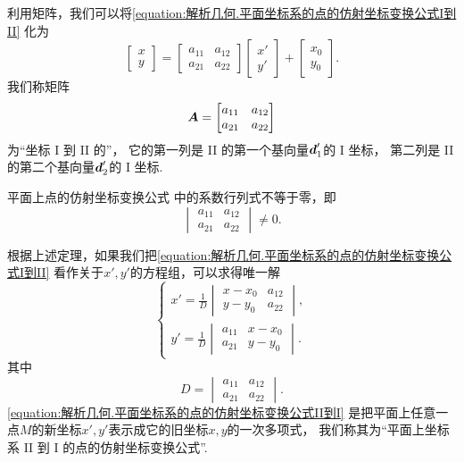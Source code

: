 利用矩阵，我们可以将\cref{equation:解析几何.平面坐标系的点的仿射坐标变换公式I到II}
化为\begin{equation}\label{equation:解析几何.平面坐标系的点的仿射坐标变换公式I到II.矩阵形式1}
	\begin{bmatrix}
		x \\ y
	\end{bmatrix}
	= \begin{bmatrix}
		a_{11} & a_{12} \\
		a_{21} & a_{22}
	\end{bmatrix} \begin{bmatrix}
		x' \\ y'
	\end{bmatrix} + \begin{bmatrix}
		x_0 \\ y_0
	\end{bmatrix}.
\end{equation}
我们称矩阵\[
	\boldsymbol{A} = \begin{bmatrix}
		a_{11} & a_{12} \\
		a_{21} & a_{22}
	\end{bmatrix}
\]为“坐标 I 到 II 的”，
它的第一列是 II 的第一个基向量\(\boldsymbol{d}_1'\)的 I 坐标，
第二列是 II 的第二个基向量\(\boldsymbol{d}_2'\)的 I 坐标.

\begin{theorem}
平面上点的仿射坐标变换公式 
中的系数行列式不等于零，即\[
	\begin{vmatrix}
		a_{11} & a_{12} \\
		a_{21} & a_{22}
	\end{vmatrix} \neq 0.
\]
\end{theorem}

根据上述定理，如果我们把\cref{equation:解析几何.平面坐标系的点的仿射坐标变换公式I到II}
看作关于\(x',y'\)的方程组，可以求得唯一解
\begin{equation}\label{equation:解析几何.平面坐标系的点的仿射坐标变换公式II到I}
	\left\{ \begin{array}{l}
		x' = \frac{1}{D} \begin{vmatrix}
			x - x_0 & a_{12} \\
			y - y_0 & a_{22}
		\end{vmatrix}, \\
		y' = \frac{1}{D} \begin{vmatrix}
			a_{11} & x - x_0 \\
			a_{21} & y - y_0
		\end{vmatrix}.
	\end{array} \right.
\end{equation}
其中\[
	D = \begin{vmatrix}
		a_{11} & a_{12} \\
		a_{21} & a_{22}
	\end{vmatrix}.
\]
\cref{equation:解析几何.平面坐标系的点的仿射坐标变换公式II到I}
是把平面上任意一点\(M\)的新坐标\(x',y'\)表示成它的旧坐标\(x,y\)的一次多项式，
我们称其为“平面上坐标系 II 到 I 的点的仿射坐标变换公式”.

